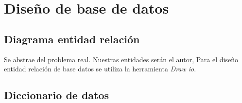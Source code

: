 \chapter*{Diseño de base de datos}
\section{Diagrama entidad relación}
Se abstrae del problema real. Nuestras entidades serán el autor, 
Para el diseño entidad relación de base datos se utiliza la herramienta \textit{Draw io}. 

\section{Diccionario de datos}


